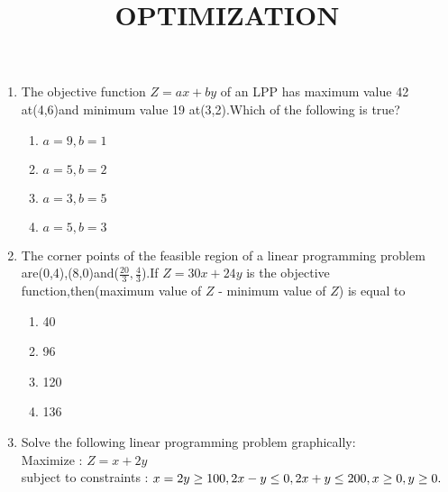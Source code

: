 \documentclass[12pt]{article}
\begin{document}
\title{\textbf{OPTIMIZATION}}
\date{}
\maketitle
\begin{enumerate}
    \item The objective function $Z=ax+by$ of an LPP has maximum value 42 at(4,6)and minimum value 19 at(3,2).Which of the following is true?
    \begin{enumerate}
        \item $a=9,b=1$
        \item $a=5,b=2$
        \item $a=3,b=5$
        \item $a=5,b=3$
    \end{enumerate}
   \item The corner points of the feasible region of a linear programming problem are(0,4),(8,0)and($\frac{20}{3},\frac{4}{3}$).If $Z=30x+24y$ is the objective function,then(maximum value of $Z$ - minimum value of $Z$) is equal to
   \begin{enumerate}
       \item 40
       \item96
       \item 120
       \item 136
   \end{enumerate}
   \item Solve the following linear programming problem graphically:\\Maximize : $Z=x+2y$\\subject to constraints : $x=2y\ge 100,\\2x-y\le 0,\\2x+y\le 200,\\x\ge0,y\ge0.$
\end{enumerate}
\end{document}
